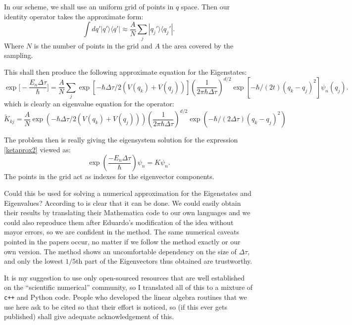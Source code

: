 \documentclass[a4paper,12pt]{article}
\newcommand{\dt}{\Delta\tau}
\newcommand{\bra}[1]{\langle #1|}
\newcommand{\ket}[1]{|#1\rangle}
\begin{document}
In our scheme, we shall use an uniform grid of points in $q$ space. Then our
identity operator takes the approximate form:
\begin{equation}
\int dq' \ket{q'}\bra{q'}\approx \frac{A}{N}\sum_j \ket{q_j'}\bra{q_j'}.
\end{equation}
Where $N$ is the number of points in the grid
and $A$ the area covered by the sampling. 

This shall then produce the following approximate equation for
the Eigenstates:
\begin{equation}\label{ketaprox3}
 \exp\big[-\frac{E_n \dt}{\hbar}\big] = \frac{A}{N}\sum_j 
\exp[-\hbar \dt/2 (V(q_k)+V(q_j))] 
  (\frac{1}{2\pi\hbar \dt})^{d/2} \exp[- \hbar/(2t) (q_k-q_j)^2]
  \psi_n(q_j).
\end{equation}
which is clearly an eigenvalue equation for the operator:
\begin{equation}\label{opK}
\tilde{K}_{kj}=\frac{A}{N}
\exp(-\hbar \dt/2 (V(q_k)+V(q_j))) 
  (\frac{1}{2\pi\hbar \dt})^{d/2} \exp(- \hbar/(2\dt) (q_k-q_j)^2)
\end{equation}

The problem then is really giving the eigensystem solution
for the expression \ref{ketaprox2} viewed as:
\begin{equation}\label{eigenv}
  \exp(\frac{- E_n \dt}{\hbar}) \psi_n  = K \psi_n.
\end{equation}
The points in the grid act as indexes for the eigenvector 
components.


Could this be used for solving a numerical approximation for the
Eigenstates and Eigenvalues? According to \cite{Hernando} is
clear that it can be done. We could easily obtain
their results by translating their Mathematica code to our
own languages and we could also reproduce them after
Eduardo's modification of the idea without mayor errors,
so we are confident in the method. The same numerical caveats 
pointed in the papers occur, no matter if we follow the
method exactly or our own version. The method shows an
uncomfortable dependency on the size of $\dt$, and
only the lowest $1/5$th part of the Eigenvectors
thus obtained are trustworthy. 

It is my suggestion
to use only open-sourced resources that are well established on
the ``scientific numerical'' community, so I translated all of
this to a mixture of \verb!c++! and Python code. People who
developed the linear algebra routines that we use here
ask to be cited so that their effort is noticed, so 
(if this ever gets published) shall give adequate
acknowledgement of this.
\end{document}
